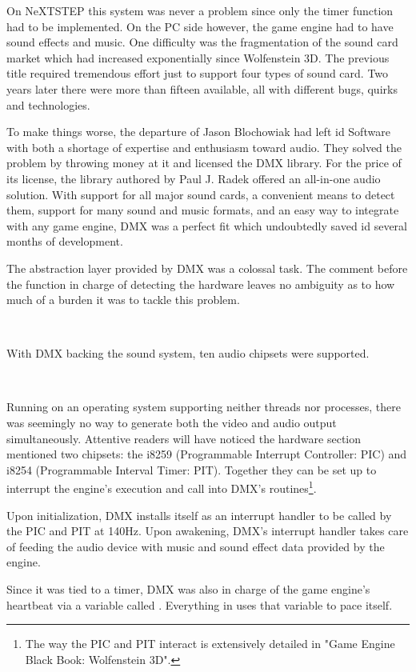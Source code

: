 On NeXTSTEP this system was never a problem since only the timer function had to be implemented. On the PC side however, the game engine had to have sound effects and music. One difficulty was the fragmentation of the sound card market which had increased exponentially since Wolfenstein 3D. The previous title required tremendous effort just to support four types of sound card. Two years later there were more than fifteen available, all with different bugs, quirks and technologies.\\
\par
To make things worse, the departure of Jason Blochowiak had left id Software with both a shortage of expertise and enthusiasm toward audio. They solved the problem by throwing money at it and licensed the DMX library. For the price of its license, the library authored by Paul J. Radek offered an all-in-one audio solution. With support for all major sound cards, a convenient means to detect them, support for many sound and music formats, and an easy way to integrate with any game engine, DMX was a perfect fit which undoubtedly saved id several months of development.





The abstraction layer provided by DMX was a colossal task. The comment before the function in charge of detecting the hardware leaves no ambiguity as to how much of a burden it was to tackle this problem.\\
\par
{}\\
\par
With DMX backing the sound system, ten audio chipsets were supported.\\
\par
{}\\
\par
Running on an operating system supporting neither threads nor processes, there was seemingly no way to generate both the video and audio output simultaneously. Attentive readers will have noticed the hardware section mentioned two chipsets: the i8259 (Programmable Interrupt Controller: PIC) and i8254 (Programmable Interval Timer: PIT). Together they can be set up to interrupt the engine's execution and call into DMX's routines\footnote{The way the PIC and PIT interact is extensively detailed in "Game Engine Black Book: Wolfenstein 3D".}.\\
\par
Upon initialization, DMX installs itself as an interrupt handler to be called by the PIC and PIT at 140Hz. Upon awakening, DMX's interrupt handler takes care of feeding the audio device with music and sound effect data provided by the engine.\\
\par
Since it was tied to a timer, DMX was also in charge of the game engine's heartbeat via a variable called . Everything in \doom{} uses that variable to pace itself.
\par


